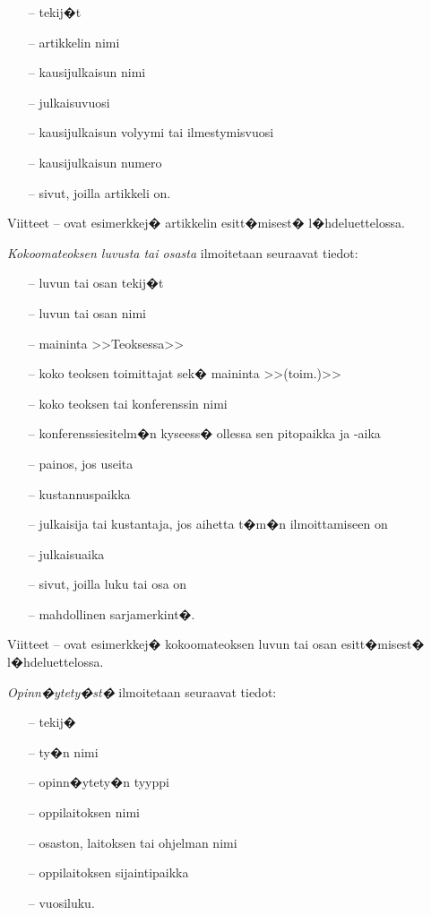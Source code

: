 \documentclass[finnish,12pt,a4paper,pdftex]{article}
\begin{document}
\begin{itemize}

\item[--]tekij�t
\item[--]artikkelin nimi
\item[--]kausijulkaisun nimi
\item[--]julkaisuvuosi
\item[--]kausijulkaisun volyymi tai ilmestymisvuosi
\item[--]kausijulkaisun numero
\item[--]sivut, joilla artikkeli on.
\end{itemize}

Viitteet \cite{bcs}--\cite{Deschamps} ovat esimerkkej� artikkelin
esitt�misest� l�hdeluettelossa.

\textit{Kokoomateoksen luvusta tai osasta} ilmoitetaan seuraavat tiedot:

\begin{itemize}
\item[--]luvun tai osan tekij�t
\item[--]luvun tai osan nimi
\item[--]maininta >>Teoksessa>>
\item[--]koko teoksen toimittajat sek� maininta >>(toim.)>>
\item[--]koko teoksen tai konferenssin nimi
\item[--]konferenssiesitelm�n kyseess� ollessa sen pitopaikka ja -aika
\item[--]painos, jos useita
\item[--]kustannuspaikka
\item[--]julkaisija tai kustantaja, jos aihetta t�m�n ilmoittamiseen on
\item[--]julkaisuaika
\item[--]sivut, joilla luku tai osa on 
\item[--]mahdollinen sarjamerkint�.
\end{itemize}

Viitteet \cite{Sihvola}--\cite{Lindblom} ovat esimerkkej�
kokoomateoksen luvun tai osan esitt�misest� l�hdeluettelossa. 

\textit{Opinn�ytety�st�} ilmoitetaan seuraavat tiedot:

\begin{itemize}
\item[--]tekij�
\item[--]ty�n nimi
\item[--]opinn�ytety�n tyyppi
\item[--]oppilaitoksen nimi
\item[--]osaston, laitoksen tai ohjelman nimi
\item[--]oppilaitoksen sijaintipaikka
\item[--]vuosiluku.
\end{itemize}
\end{document}
